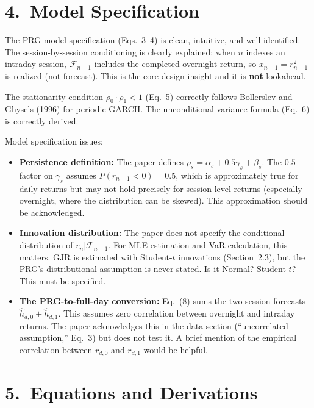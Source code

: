 \documentclass[12pt,a4paper]{article}
\begin{document}
\section*{4.\ Model Specification}

\textcolor{okgreen}{The PRG model specification (Eqs.\ 3--4) is clean, intuitive, and well-identified.} The session-by-session conditioning is clearly explained: when $n$ indexes an intraday session, $\mathcal{F}_{n-1}$ includes the completed overnight return, so $x_{n-1} = r^2_{n-1}$ is realized (not forecast). This is the core design insight and it is \textbf{not} lookahead.

\textcolor{okgreen}{The stationarity condition} $\rho_0 \cdot \rho_1 < 1$ (Eq.\ 5) correctly follows Bollerslev and Ghysels (1996) for periodic GARCH. The unconditional variance formula (Eq.\ 6) is correctly derived.

\textcolor{warncolor}{Model specification issues:}
\begin{itemize}[nosep]
\item \textbf{Persistence definition:} The paper defines $\rho_s = \alpha_s + 0.5\gamma_s + \beta_s$. The $0.5$ factor on $\gamma_s$ assumes $P(r_{n-1} < 0) = 0.5$, which is approximately true for daily returns but may not hold precisely for session-level returns (especially overnight, where the distribution can be skewed). This approximation should be acknowledged.
\item \textbf{Innovation distribution:} The paper does not specify the conditional distribution of $r_n | \mathcal{F}_{n-1}$. For MLE estimation and VaR calculation, this matters. GJR is estimated with Student-$t$ innovations (Section~2.3), but the PRG's distributional assumption is never stated. Is it Normal? Student-$t$? This must be specified.
\item \textbf{The PRG-to-full-day conversion:} Eq.\ (8) sums the two session forecasts $\hat{h}_{d,0} + \hat{h}_{d,1}$. This assumes zero correlation between overnight and intraday returns. The paper acknowledges this in the data section (``uncorrelated assumption,'' Eq.\ 3) but does not test it. A brief mention of the empirical correlation between $r_{d,0}$ and $r_{d,1}$ would be helpful.
\end{itemize}


\section*{5.\ Equations and Derivations}
\end{document}
